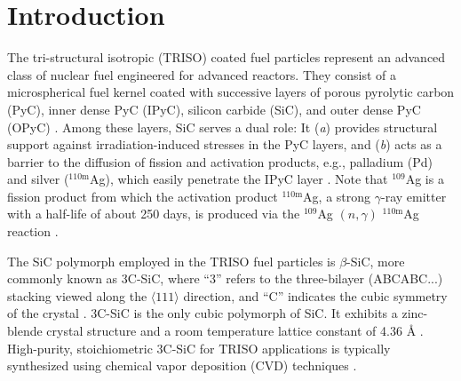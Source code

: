 \documentclass[%
preprint,
amsmath,amssymb,
aps,
]{revtex4-2}
\newcommand{\?}{\stackrel{?}{=}}
\begin{document}

\maketitle


\section{Introduction}


The tri-structural isotropic (TRISO) coated fuel particles represent an advanced class of nuclear fuel engineered for advanced reactors. They consist of a microspherical fuel kernel coated with successive layers of porous pyrolytic carbon (PyC), inner dense PyC (IPyC), silicon carbide (SiC), and outer dense PyC (OPyC) \cite{Minato2020}. Among these layers, SiC serves a dual role: It (\textit{a}) provides structural support against irradiation-induced stresses in the PyC layers, and (\textit{b}) acts as a barrier to the diffusion of fission and activation products, e.g., palladium (Pd) and silver ($^{\text{110m}}$Ag), which easily penetrate the IPyC layer \cite{Snead2007, Verfondern2020}. Note that $^{109}$Ag is a fission product from which the activation product $^{\text{110m}}$Ag, a strong $\gamma$-ray emitter with a half-life of about 250 days, is produced via the $^{109}$Ag $(n, \gamma)$ $^\text{110m}$Ag reaction \cite{Lopez-Honorato2010, VanRooyen2014b}.

The SiC polymorph employed in the TRISO fuel particles is $\beta$-SiC, more commonly known as 3C-SiC, where ``3'' refers to the three-bilayer (ABCABC...) stacking viewed along the $\langle 111 \rangle$ direction, and ``C'' indicates the cubic symmetry of the crystal \cite{Shaffer1969}. 3C-SiC is the only cubic polymorph of SiC. It exhibits a zinc-blende crystal structure and a room temperature lattice constant of 4.36 {\AA} \cite{Sultan2022}. High-purity, stoichiometric 3C-SiC for TRISO applications is typically synthesized using chemical vapor deposition (CVD) techniques \cite{Snead2007}.
\end{document}

